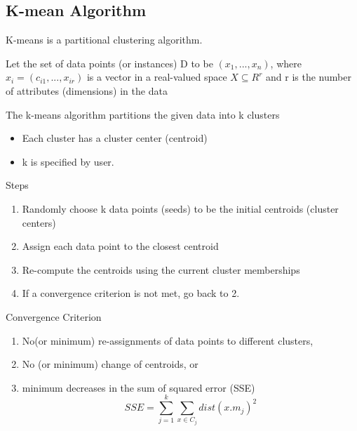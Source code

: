 \documentclass[
]{book}
\providecommand{\tightlist}{%
  \setlength{\itemsep}{0pt}\setlength{\parskip}{0pt}}
\begin{document}
\hypertarget{k-mean-algorithm}{%
\subsection{K-mean Algorithm}\label{k-mean-algorithm}}

K-means is a partitional clustering algorithm.

Let the set of data points (or instances) D to be \((x_1,...,x_n)\), where \(x_i = (c_{i1},...,x_{ir})\) is a vector in a real-valued space \(X \subseteq R^r\) and r is the number of attributes (dimensions) in the data

The k-means algorithm partitions the given data into k clusters

\begin{itemize}
\tightlist
\item
  Each cluster has a cluster center (centroid)\\
\item
  k is specified by user.
\end{itemize}

Steps

\begin{enumerate}
\def\labelenumi{\arabic{enumi}.}
\tightlist
\item
  Randomly choose k data points (seeds) to be the initial centroids (cluster centers)\\
\item
  Assign each data point to the closest centroid\\
\item
  Re-compute the centroids using the current cluster memberships\\
\item
  If a convergence criterion is not met, go back to 2.
\end{enumerate}

Convergence Criterion

\begin{enumerate}
\def\labelenumi{\arabic{enumi}.}
\tightlist
\item
  No(or minimum) re-assignments of data points to different clusters,\\
\item
  No (or minimum) change of centroids, or\\
\item
  minimum decreases in the sum of squared error (SSE) \[
  SSE = \sum_{j=1}^{k}\sum_{x\in C_j}dist(x.m_j)^2
  \]
\end{enumerate}
\end{document}
